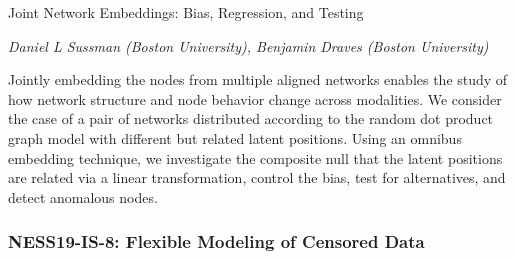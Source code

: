 \begin{itemize}
Joint Network Embeddings: Bias, Regression, and Testing

\emph{\footnotesize Daniel L Sussman (Boston University), Benjamin Draves (Boston University)}

Jointly embedding the nodes from multiple aligned networks enables the study of how network structure and node behavior change across modalities. We consider the case of a pair of networks distributed according to the random dot product graph model with different but related latent positions. Using an omnibus embedding technique, we investigate the composite null that the latent positions are related via a linear transformation, control the bias, test for alternatives, and detect anomalous nodes.

\end{itemize}

\subsubsection*{NESS19-IS-8: Flexible Modeling of Censored Data}

